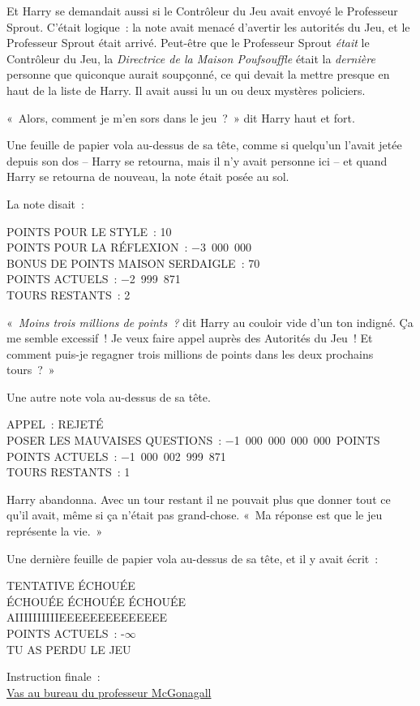Et Harry se demandait aussi si le Contrôleur du Jeu avait envoyé le Professeur Sprout. C'était logique~: la note avait menacé d'avertir les autorités du Jeu, et le Professeur Sprout était arrivé. Peut-être que le Professeur Sprout \emph{était} le Contrôleur du Jeu, la \emph{Directrice de la Maison Poufsouffle} était la \emph{dernière} personne que quiconque aurait soupçonné, ce qui devait la mettre presque en haut de la liste de Harry. Il avait aussi lu un ou deux mystères policiers.

«~Alors, comment je m'en sors dans le jeu~?~» dit Harry haut et fort.

Une feuille de papier vola au-dessus de sa tête, comme si quelqu'un l'avait jetée depuis son dos -- Harry se retourna, mais il n'y avait personne ici -- et quand Harry se retourna de nouveau, la note était posée au sol.

La note disait~:
\begin{writtenNote}\centering
POINTS POUR LE STYLE~: 10\\
POINTS POUR LA RÉFLEXION~: −3~000~000\\
BONUS DE POINTS MAISON SERDAIGLE~: 70\\
POINTS ACTUELS~: −2~999~871\\
TOURS RESTANTS~: 2
\end{writtenNote}

«~\emph{Moins trois millions de points~?} dit Harry au couloir vide d'un ton indigné. Ça me semble excessif~! Je veux faire appel auprès des Autorités du Jeu~! Et comment puis-je regagner trois millions de points dans les deux prochains tours~?~»

Une autre note vola au-dessus de sa tête.
\begin{writtenNote}\centering
APPEL~: REJETÉ\\
POSER LES MAUVAISES QUESTIONS~: −1~000~000~000~000~POINTS\\
POINTS ACTUELS~: −1~000~002~999~871\\
TOURS RESTANTS~: 1
\end{writtenNote}

Harry abandonna. Avec un tour restant il ne pouvait plus que donner tout ce qu'il avait, même si ça n'était pas grand-chose. «~Ma réponse est que le jeu représente la vie.~»

Une dernière feuille de papier vola au-dessus de sa tête, et il y avait écrit~:

\begin{writtenNote}\centering
\begin{center}\scshape
TENTATIVE ÉCHOUÉE\\
ÉCHOUÉE ÉCHOUÉE ÉCHOUÉE\\
AIIIIIIIIIIEEEEEEEEEEEEEE\\
POINTS ACTUELS~: -$\infty$\\
\MakeUppercase{TU AS PERDU LE JEU}

Instruction finale~:\\
\underline{Vas au bureau du professeur McGonagall}
\end{center}
\end{writtenNote}

